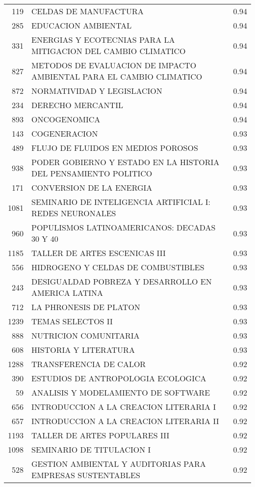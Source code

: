 \begin{table}[ht]
\begin{tabular}{rlr}
  119 & CELDAS DE MANUFACTURA & 0.94 \\ 
  285 & EDUCACION AMBIENTAL & 0.94 \\ 
  331 & ENERGIAS Y ECOTECNIAS PARA LA MITIGACION DEL CAMBIO CLIMATICO & 0.94 \\ 
  827 & METODOS DE EVALUACION DE IMPACTO AMBIENTAL PARA EL CAMBIO CLIMATICO & 0.94 \\ 
  872 & NORMATIVIDAD Y LEGISLACION & 0.94 \\ 
  234 & DERECHO MERCANTIL & 0.94 \\ 
  893 & ONCOGENOMICA & 0.94 \\ 
  143 & COGENERACION & 0.93 \\ 
  489 & FLUJO DE FLUIDOS EN MEDIOS POROSOS & 0.93 \\ 
  938 & PODER GOBIERNO Y ESTADO EN LA HISTORIA DEL PENSAMIENTO POLITICO & 0.93 \\ 
  171 & CONVERSION DE LA ENERGIA & 0.93 \\ 
  1081 & SEMINARIO DE INTELIGENCIA ARTIFICIAL I: REDES NEURONALES & 0.93 \\ 
  960 & POPULISMOS LATINOAMERICANOS: DECADAS 30 Y 40 & 0.93 \\ 
  1185 & TALLER DE ARTES ESCENICAS III & 0.93 \\ 
  556 & HIDROGENO Y CELDAS DE COMBUSTIBLES & 0.93 \\ 
  243 & DESIGUALDAD POBREZA Y DESARROLLO EN AMERICA LATINA & 0.93 \\ 
  712 & LA PHRONESIS DE PLATON & 0.93 \\ 
  1239 & TEMAS SELECTOS II & 0.93 \\ 
  888 & NUTRICION COMUNITARIA & 0.93 \\ 
  608 & HISTORIA Y LITERATURA & 0.93 \\ 
  1288 & TRANSFERENCIA DE CALOR & 0.92 \\ 
  390 & ESTUDIOS DE ANTROPOLOGIA ECOLOGICA & 0.92 \\ 
  59 & ANALISIS Y MODELAMIENTO DE SOFTWARE & 0.92 \\ 
  656 & INTRODUCCION A LA CREACION LITERARIA I & 0.92 \\ 
  657 & INTRODUCCION A LA CREACION LITERARIA II & 0.92 \\ 
  1193 & TALLER DE ARTES POPULARES III & 0.92 \\ 
  1098 & SEMINARIO DE TITULACION I & 0.92 \\ 
  528 & GESTION AMBIENTAL Y AUDITORIAS PARA EMPRESAS SUSTENTABLES & 0.92 \\ 

\end{tabular}
\end{table}
